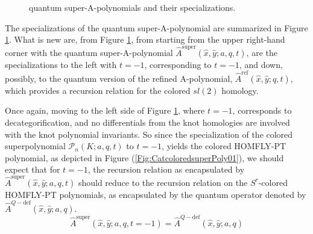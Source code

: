 \documentclass[a4paper,titlepage,twoside]{book}
\begin{document}
\begin{figure}[h]
\begin{center}
\end{center}
\caption{ quantum super-A-polynomials and their specializations.  }
\label{Fig:qsuperApolyspecializations}
\end{figure}

The specializations of the quantum super-A-polynomial are summarized in Figure \ref{Fig:qsuperApolyspecializations}.  What is new are, from Figure \ref{Fig:qsuperApolyspecializations}, from starting from the upper right-hand corner with the quantum super-A-polynomial $\widehat{A}^{\text{super}}{(\widehat{x},\widehat{y};a,q,t)}$, are the specializations to the left with $t=-1$, corresponding to $t=-1$, and down, possibly, to the quantum version of the refined A-polynomial, $\widehat{A}^{\text{ref}}{(\widehat{x},\widehat{y};q,t)}$, which provides a recursion relation for the colored $sl{(2)}$ homology.  

Once again, moving to the left side of Figure \ref{Fig:qsuperApolyspecializations}, where $t=-1$, corresponds to decategorification, and no differentials from the knot homologies are involved with the knot polynomial invariants.  So since the specialization of the colored superpolynomial $\mathcal{P}_n{ (K;a,q,t)}$ to $t=-1$, yields the colored HOMFLY-PT polynomial, as depicted in Figure (\ref{Fig:CatcoloredsuperPoly01}), we should expect that for $t=-1$, the recursion relation as encapsulated by $\widehat{A}^{ \text{super}}{ (\widehat{x}, \widehat{y};a,q,t)}$ should reduce to the recursion relation on the $S^r$-colored HOMFLY-PT polynomials, as encapsulated by the quantum operator denoted by $\widehat{A}^{Q-\text{def}}{ (\widehat{x},\widehat{y};a,q)}$.  
\begin{equation}
    \widehat{A}^{\text{super}}{ ( \widehat{x}, \widehat{y}; a, q,t=-1) } = \widehat{A}^{Q-\text{def}}{ (\widehat{x}, \widehat{y}; a,q)} \label{eq:qsApt=-1}
\end{equation}
\end{document}
